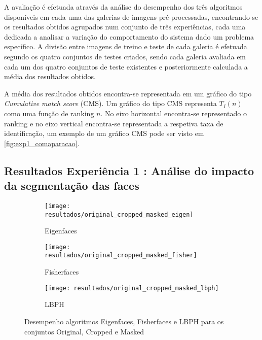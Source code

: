 A avaliação é efetuada através da análise do desempenho dos três algoritmos disponíveis em cada uma das galerias de imagens pré-processadas, encontrando-se os resultados obtidos agrupados num conjunto de três experiências, cada uma dedicada a analisar a variação do comportamento do sistema dado um problema específico. A divisão entre imagens de treino e teste de cada galeria é efetuada segundo os quatro conjuntos de testes criados, sendo cada galeria avaliada em cada um dos quatro conjuntos de teste existentes e posteriormente calculada a média dos resultados obtidos.

A média dos resultados obtidos encontra-se representada em um gráfico do tipo \textit{Cumulative match score} (CMS). Um gráfico do tipo CMS representa $T_{I}(n)$ como uma função de ranking $n$. No eixo horizontal encontra-se representado o ranking e no eixo vertical encontra-se representada a respetiva taxa de identificação, um exemplo de um gráfico CMS pode ser visto em \ref{fig:exp1_comaparacao}.

\subsection{Resultados Experiência 1 : Análise do impacto da segmentação das faces}

\begin{figure}[p]
        \centering
        \begin{subfigure}[b]{0.58\textwidth}
                \centering
                \texttt{[image: resultados/original\_cropped\_masked\_eigen]}
                \caption{Eigenfaces}
                \label{fig:original_cropped_masked_eigen}
        \end{subfigure}%

        \begin{subfigure}[b]{0.58\textwidth}
                \centering
                \texttt{[image: resultados/original\_cropped\_masked\_fisher]}
                \caption{Fisherfaces}
                \label{fig:original_cropped_masked_fisher}
        \end{subfigure}

        \begin{subfigure}[b]{0.58\textwidth}
                \centering
                \texttt{[image: resultados/original\_cropped\_masked\_lbph]}
                \caption{LBPH}
                \label{fig:original_cropped_masked_lbph}
        \end{subfigure}
        \caption{Desempenho algoritmos Eigenfaces, Fisherfaces e LBPH para os conjuntos Original, Cropped e Masked}
        \label{fig:original_cropped_masked}
\end{figure}

